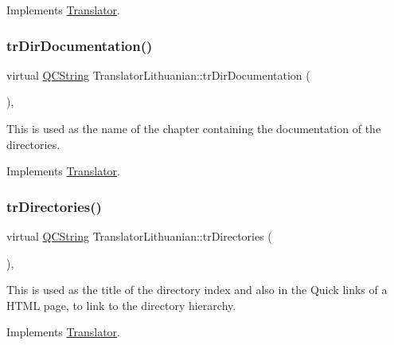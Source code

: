 Implements \mbox{\hyperlink{class_translator}{Translator}}.

\mbox{\label{class_translator_lithuanian_aae36eface98b68757c50a66408d1c016}} 
\subsubsection{\texorpdfstring{trDirDocumentation()}{trDirDocumentation()}}
{\footnotesize\ttfamily virtual \mbox{\hyperlink{class_q_c_string}{Q\+C\+String}} Translator\+Lithuanian\+::tr\+Dir\+Documentation (\begin{DoxyParamCaption}{ }\end{DoxyParamCaption})\hspace{0.3cm}{\ttfamily [inline]}, {\ttfamily [virtual]}}

This is used as the name of the chapter containing the documentation of the directories. 

Implements \mbox{\hyperlink{class_translator}{Translator}}.

\mbox{\label{class_translator_lithuanian_affba1050665c411e2911b41246e0b370}} 
\subsubsection{\texorpdfstring{trDirectories()}{trDirectories()}}
{\footnotesize\ttfamily virtual \mbox{\hyperlink{class_q_c_string}{Q\+C\+String}} Translator\+Lithuanian\+::tr\+Directories (\begin{DoxyParamCaption}{ }\end{DoxyParamCaption})\hspace{0.3cm}{\ttfamily [inline]}, {\ttfamily [virtual]}}

This is used as the title of the directory index and also in the Quick links of a H\+T\+ML page, to link to the directory hierarchy. 

Implements \mbox{\hyperlink{class_translator}{Translator}}.

\mbox{\label{class_translator_lithuanian_a669ef2fc09a32f4eaad9a85371d3b604}} 
